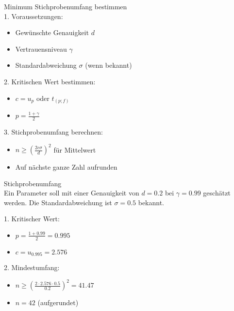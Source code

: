 \begin{KR}{Minimum Stichprobenumfang bestimmen}\\
1. Voraussetzungen:
   \begin{itemize}
     \item Gewünschte Genauigkeit $d$
     \item Vertrauensniveau $\gamma$
     \item Standardabweichung $\sigma$ (wenn bekannt)
   \end{itemize}

2. Kritischen Wert bestimmen:
   \begin{itemize}
     \item $c=u_p$ oder $t_{(p;f)}$
     \item $p=\frac{1+\gamma}{2}$
   \end{itemize}

3. Stichprobenumfang berechnen:
   \begin{itemize}
     \item $n \geq (\frac{2c\sigma}{d})^2$ für Mittelwert
     \item Auf nächste ganze Zahl aufrunden
   \end{itemize}
\end{KR}

\begin{example2}{Stichprobenumfang}\\
Ein Parameter soll mit einer Genauigkeit von $d=0.2$ bei $\gamma=0.99$ geschätzt werden. Die Standardabweichung ist $\sigma=0.5$ bekannt.

1. Kritischer Wert:
   \begin{itemize}
     \item $p=\frac{1+0.99}{2}=0.995$
     \item $c=u_{0.995}=2.576$
   \end{itemize}

2. Mindestumfang:
   \begin{itemize}
     \item $n \geq (\frac{2 \cdot 2.576 \cdot 0.5}{0.2})^2=41.47$
     \item $n=42$ (aufgerundet)
   \end{itemize}
\end{example2}

